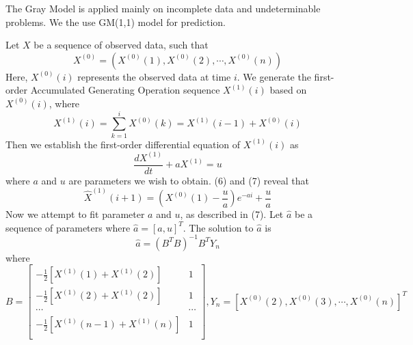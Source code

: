 The Gray Model is applied mainly on incomplete data and undeterminable problems. We the use GM(1,1) model for prediction.\cite{12}

Let $X$ be a sequence of observed data, such that
\begin{equation}
X^{(0)} = (X^{(0)}(1),X^{(0)}(2),\cdots,X^{(0)}(n))
\end{equation}
Here, $X^{(0)}(i)$ represents the observed data at time $i$. We generate the first-order Accumulated Generating Operation sequence  $X^{(1)}(i)$ based on $X^{(0)}(i)$, where
\begin{equation}
X^{(1)}(i) = \sum_{k=1}^i X^{(0)}(k) = X^{(1)}(i-1)+X^{(0)}(i)
\end{equation}
Then we establish the first-order differential equation of $X^{(1)}(i)$ as
\begin{equation}
\frac{dX^{(1)}}{dt}+aX^{(1)}=u
\end{equation}
where $a$ and $u$ are parameters we wish to obtain. (6) and (7) reveal that
\begin{equation}
\hat{X}^{(1)}(i+1) = (X^{(0)}(1)-\frac{u}{a})e^{-ai}+\frac{u}{a}
\end{equation}
Now we attempt to fit parameter $a$ and $u$, as described in (7). Let $\hat{a}$ be a sequence of parameters where $\hat{a}=[a,u]^T$. The solution to $\hat{a}$ is
\begin{equation}
\hat{a} = (B^T B)^{-1}B^TY_n
\end{equation}
where
\begin{equation}
B=\left[
\begin{array}{cc}
-\frac{1}{2}[X^{(1)}(1)+X^{(1)}(2)] & 1\\
-\frac{1}{2}[X^{(1)}(2)+X^{(1)}(2)] & 1\\
\cdots & \cdots \\
-\frac{1}{2}[X^{(1)}(n-1)+X^{(1)}(n)] & 1\\
\end{array}
\right],
Y_n = [X^{(0)}(2),X^{(0)}(3),\cdots, X^{(0)}(n)]^T
\end{equation}

